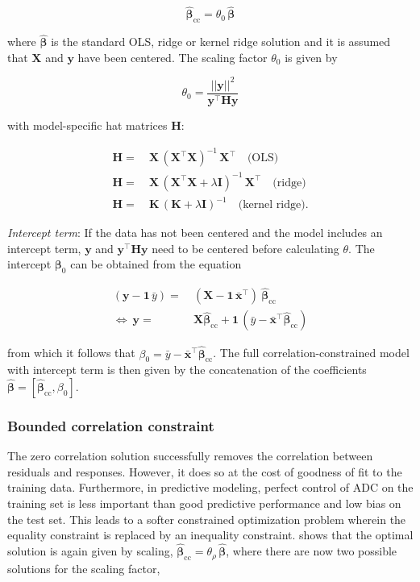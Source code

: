\documentclass[utf8]{frontiersSCNS} %
\renewcommand{\a}{\theta}
\newcommand{\az}{\a_0}
\newcommand{\ar}{\a_\rho}
\renewcommand{\b}{\boldsymbol{\beta}} %
\newcommand{\bh}{\boldsymbol{\hat{\beta}}} %
\newcommand{\bcc}{\boldsymbol{\hat{\beta}}_\text{cc}} %
\renewcommand{\H}{\mathbf{H}}
\newcommand{\I}{\mathbf{I}}
\newcommand{\K}{\mathbf{K}}
\newcommand{\mx}{\mathbf{\bar{x}}}
\newcommand{\my}{\bar{y}}
\newcommand{\one}{\mathbf{1}}
\newcommand{\X}{\mathbf{X}}
\newcommand{\y}{\mathbf{y}}
\begin{document}
\begin{equation}
 \bcc = \az\, \bh
\end{equation}

where $\bh$ is the standard OLS, ridge or kernel ridge solution and it is assumed that $\X$ and $\y$ have been centered. The scaling factor $\az$ is given by

\begin{equation}\label{eq:scaling_factor}
 \az = \frac{||\y||^2}{\y^\top\H\y}
\end{equation}

with model-specific hat matrices $\H$:

\begin{equation*}
\begin{split}
\H =&\ \X\,(\X^\top\X)^{-1}\,\X^\top\quad \text{(OLS)}\\
\H =&\ \X\,(\X^\top\X + \lambda\I)^{-1}\,\X^\top  \quad\text{(ridge)}\\
\H =&\ \K\,(\K + \lambda\I)^{-1}\quad\text{(kernel ridge)}.
\end{split}
\end{equation*}

\textit{Intercept term}: If the data has not been centered and the model includes an intercept term, $\y$ and $\y^\top\H\y$ need to be centered before calculating $\a$. The intercept $\b_0$ can be obtained from the equation

\begin{equation*}
\begin{split}
(\y - \one\, \my) =&\  (\X - \one\,\mx^\top)\ \bcc\\
\Leftrightarrow\ \y =&\ \X\bcc + \one\,(\my - \mx^\top\bcc)
\end{split}
\end{equation*}


from which it follows that $\beta_0 = \my - \mx^\top\bcc$. The full correlation-constrained model with intercept term is then given by the concatenation of the coefficients $\bh = [\bcc, \beta_0]$.

\subsubsection{Bounded correlation constraint}

The zero correlation solution successfully removes the correlation between residuals and responses. However, it does so at the cost of goodness of fit to the training data. Furthermore, in predictive modeling, perfect control of ADC on the training set is less important than good predictive performance and low bias on the test set. 
This leads to a softer constrained optimization problem wherein the equality constraint is replaced by an inequality constraint.  shows that the optimal solution is again given by scaling,  $\bcc = \ar\, \bh$, where there are now two possible solutions for the scaling factor,
\end{document}
